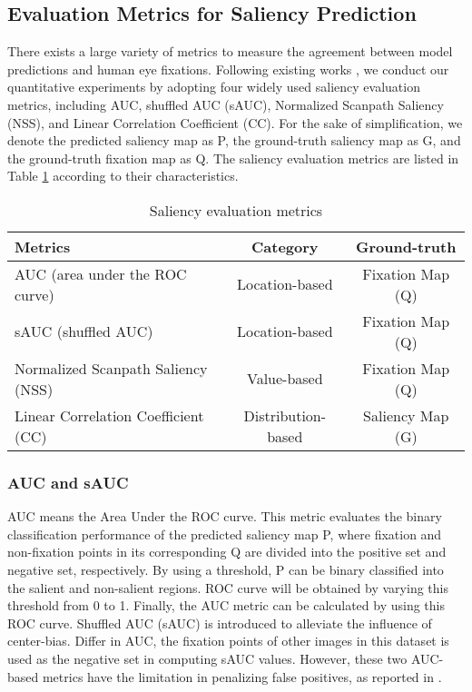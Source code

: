 




\subsection{Evaluation Metrics for Saliency Prediction} 


There exists a large variety of metrics to measure the agreement between model predictions and human eye fixations.  Following existing works \cite{salMetrics_Bylinskii,riche2013saliency}, we conduct our quantitative experiments by adopting four widely used saliency evaluation metrics, including AUC, shuffled AUC (sAUC), Normalized Scanpath Saliency (NSS), and Linear Correlation Coefficient (CC). For the sake of simplification, we denote the predicted saliency map as P, the ground-truth saliency map as G, and the ground-truth fixation map as Q. The saliency evaluation metrics are listed in Table \ref{tab:evaluation} according to their characteristics.


\begin{table}[]
	\centering
	\scriptsize
	\caption{Saliency evaluation metrics}
	\label{tab:evaluation}
	\begin{tabular}{|l|c|c|}
		\hline
		Metrics                             & Category           & Ground-truth  \\ \hline \hline
		AUC (area under the ROC curve)      & Location-based     & Fixation Map (Q)\\  \hline
		sAUC (shuffled AUC)                 & Location-based     & Fixation Map (Q)\\ \hline
		Normalized Scanpath Saliency (NSS)  & Value-based        & Fixation Map (Q)\\ \hline
		Linear Correlation Coefficient (CC) & Distribution-based & Saliency Map (G) \\ \hline
	\end{tabular}
	\vspace{-4mm}
\end{table}

\subsubsection{AUC and sAUC}
AUC means the Area Under the ROC curve. This metric evaluates the binary classification performance of the predicted saliency map P, where fixation and non-fixation points in its corresponding Q are divided into the positive set and negative set, respectively. By using a threshold, P can be binary classified into the salient and non-salient regions. ROC curve will be obtained by varying this threshold from 0 to 1. Finally, the AUC metric can be calculated by using this ROC curve. Shuffled AUC (sAUC) is introduced to alleviate the influence of center-bias. Differ in AUC, the fixation points of other images in this dataset is used as the negative set in computing sAUC values. However, these two AUC-based metrics have the limitation in penalizing false positives, as reported in \cite{kruthiventi2017deepfix,liu2016deep,cornia2016predicting}.


